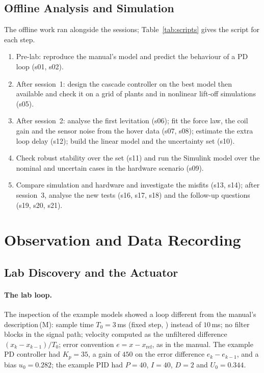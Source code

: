 \documentclass[11pt,a4paper]{article}
\newcommand{\code}[1]{\texttt{\detokenize{#1}}}
\newcommand{\st}[1]{\,\textup{(#1)}}
\begin{document}
\subsection{Offline Analysis and Simulation}
\label{sec:proc-offline}
The offline work ran alongside the sessions; Table~\ref{tab:scripts} gives the script for each step.
\begin{enumerate}
\item Pre-lab: reproduce the manual's model and predict the behaviour of a PD loop (s01, s02).
\item After session~1: design the cascade controller on the best model then available and check it on a grid of plants
      and in nonlinear lift-off simulations (s05).
\item After session~2: analyse the first levitation (s06); fit the force law, the coil gain and the sensor noise from the
      hover data (s07, s08); estimate the extra loop delay (s12); build the linear model and the uncertainty set (s10).
\item Check robust stability over the set (s11) and run the Simulink model over the nominal and uncertain cases in the
      hardware scenario (s09).
\item Compare simulation and hardware and investigate the misfits (s13, s14); after session~3, analyse the new tests (s16,
      s17, s18) and the follow-up questions (s19, s20, s21).
\end{enumerate}


\section{Observation and Data Recording}
\label{sec:obs}

\subsection{Lab Discovery and the Actuator}
\label{sec:obs-discovery}
\paragraph{The lab loop.} The inspection of the example models showed a loop different from the manual's
description\st{M}: sample time $T_0=3$\,ms (fixed step, \code{ode3}) instead of $10$\,ms; no filter blocks in the signal path;
velocity computed as the unfiltered difference $(x_k-x_{k-1})/T_0$; error convention $e = x - x_{\mathrm{ref}}$, as in the
manual. The example PD controller had $K_p = 35$, a gain of $450$ on the error difference $e_k - e_{k-1}$, and a bias
$u_0 = 0.282$; the example PID had $P=40$, $I=40$, $D=2$ and $U_0 = 0.344$.
\end{document}
